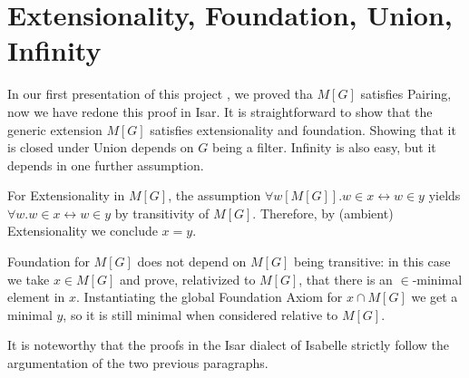 \section{Extensionality, Foundation, Union, Infinity}
\label{sec:easy-axioms}

In our first presentation of this project \cite{2018arXiv180705174G},
we proved tha $M[G]$ satisfies Pairing, now we have redone this proof
in Isar. It is straightforward to show that the generic extension
$M[G]$ satisfies extensionality and foundation. Showing that it is
closed under Union depends on $G$ being a filter. Infinity is also
easy, but it depends in one further assumption.


For Extensionality in $M[G]$, the assumption 
$\forall w[M[G]]. w\in x \leftrightarrow w\in y$ yields 
$\forall w. w\in x \leftrightarrow w\in y$ by transitivity of $M[G]$. %
Therefore, by (ambient) Extensionality we conclude $x=y$. 

Foundation for $M[G]$ does not depend on $M[G]$ being transitive: in
this case we take $x\in M[G]$ and prove, relativized to $M[G]$,  that there is an
$\in$\kern -1pt-minimal element in $x$. Instantiating the global Foundation
Axiom for $x\cap M[G]$ we get a minimal $y$, so it is still minimal
when considered relative to $M[G]$. 

It is noteworthy that the proofs in the Isar dialect of Isabelle
strictly follow the argumentation of the two previous paragraphs.

